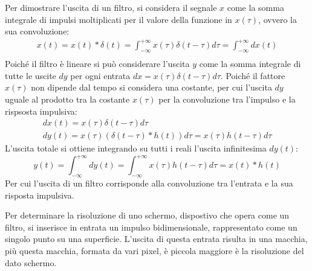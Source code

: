 \documentclass{article}
\numberwithin{equation}{subsection}
\begin{document}
Per dimostrare l'uscita di un filtro, si considera il segnale $x$ come la somma integrale di impulsi moltiplicati per il valore della funzione in $x(\tau)$, ovvero la sua 
convoluzione:
\begin{gather*}
    x(t)=x(t)*\delta(t)=\displaystyle\int_{-\infty}^{+\infty}x(\tau)\delta(t-\tau)d\tau=\int_{-\infty}^{+\infty}dx(t)\\
\end{gather*}
Poiché il filtro è lineare si può considerare l'uscita $y$ come la somma integrale di tutte le uscite $dy$ per ogni entrata $dx=x(\tau)\delta(t-\tau)d\tau$. Poiché il fattore 
$x(\tau)$ non dipende dal tempo si considera una costante, per cui l'uscita $dy$ uguale al prodotto tra la costante $x(\tau)$ per la convoluzione tra l'impulso e la 
rispsosta impulsiva:
\begin{gather*}
    dx(t)=x(\tau)\delta(t-\tau)d\tau\\
    dy(t)=x(\tau)(\delta(t-\tau)*h(t))d\tau=x(\tau)h(t-\tau)d\tau
\end{gather*}
L'uscita totale si ottiene integrando su tutti i reali l'uscita infinitesima $dy(t)$:
\begin{equation*}
    y(t)=\displaystyle\int_{-\infty}^{+\infty}dy(t)=\int_{-\infty}^{+\infty}x(\tau)h(t-\tau)d\tau=x(t)*h(t)
\end{equation*}
Per cui l'uscita di un filtro corrisponde alla convoluzione tra l'entrata e la sua risposta impulsiva. 

Per determinare la risoluzione di uno schermo, dispostivo che opera come un filtro, si inserisce in entrata un impulso bidimensionale, rappresentato come un singolo punto 
su una superficie. L'uscita di questa entrata risulta in una macchia, più questa macchia, formata da vari pixel, è piccola maggiore è la risoluzione del dato schermo.  
\end{document}
